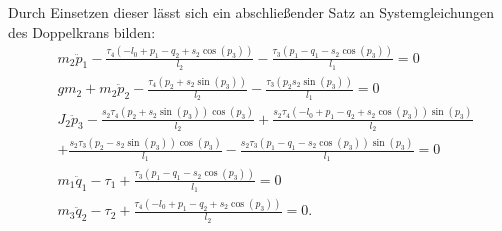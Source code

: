 Durch Einsetzen dieser lässt sich ein abschließender Satz an Systemgleichungen des Doppelkrans bilden:
\begin{subequations}
	\begin{flalign}
		&m_{2} \ddot{p}_{1} - \frac{\tau_{4} \left(- l_{0} + p_{1} - q_{2} + s_{2} \cos{\left(p_{3} \right)}\right)}{l_{2}} - \frac{\tau_{3} \left(p_{1} - q_{1} - s_{2} \cos{\left(p_{3} \right)}\right)}{l_{1}} = 0 \label{double_flat_syseq1}\\
		&g m_{2} + m_{2} \ddot{p}_{2} - \frac{\tau_{4} \left(p_{2} + s_{2} \sin{\left(p_{3} \right)}\right)}{l_{2}} - \frac{\tau_{3} \left(p_{2} s_{2} \sin{\left(p_{3} \right)}\right)}{l_{1}} = 0 \label{double_flat_syseq2}\\
		&J_{2} \ddot{p}_{3} - \frac{s_{2} \tau_{4} \left(p_{2} + s_{2} \sin{\left(p_{3} \right)}\right) \cos{\left(p_{3} \right)}}{l_{2}} + \frac{s_{2} \tau_{4} \left(- l_{0} + p_{1} - q_{2} + s_{2} \cos{\left(p_{3} \right)}\right) \sin{\left(p_{3} \right)}}{l_{2}} \nonumber\\
		&+ \frac{s_{2} \tau_{3} \left(p_{2} - s_{2} \sin{\left(p_{3} \right)}\right) \cos{\left(p_{3} \right)}}{l_{1}} - \frac{s_{2} \tau_{3} \left(p_{1} - q_{1} - s_{2} \cos{\left(p_{3} \right)}\right) \sin{\left(p_{3} \right)}}{l_{1}} = 0 \label{double_flat_syseq3}\\
		&m_{1} \ddot{q}_{1} - \tau_{1} + \frac{\tau_{3} \left(p_{1} - q_{1} - s_{2} \cos{\left(p_{3} \right)}\right)}{l_{1}} = 0 \label{double_flat_syseq4}\\
		&m_{3} \ddot{q}_{2} - \tau_{2} + \frac{\tau_{4} \left(- l_{0} + p_{1} - q_{2} + s_{2} \cos{\left(p_{3} \right)}\right)}{l_{2}} = 0\label{double_flat_syseq5}.
	\end{flalign}
\end{subequations}

